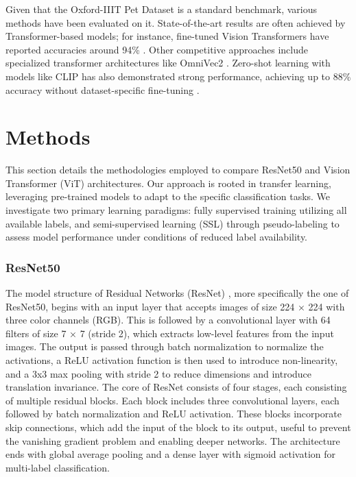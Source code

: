 \documentclass{article}
\begin{document}
Given that the Oxford-IIIT Pet Dataset is a standard benchmark, various methods have been evaluated on it. State-of-the-art results are often achieved by Transformer-based models; for instance, fine-tuned Vision Transformers have reported accuracies around 94\% \cite{HFNorburayViTPets}. Other competitive approaches include specialized transformer architectures like OmniVec2 \cite{Srivastava2024OmniVec2}. Zero-shot learning with models like CLIP has also demonstrated strong performance, achieving up to 88\% accuracy without dataset-specific fine-tuning \cite{HFMuellje3ViTPets}.



\section{Methods}
This section details the methodologies employed to compare ResNet50 and Vision Transformer (ViT) architectures. Our approach is rooted in transfer learning, leveraging pre-trained models to adapt to the specific classification tasks. We investigate two primary learning paradigms: fully supervised training utilizing all available labels, and semi-supervised learning (SSL) through pseudo-labeling to assess model performance under conditions of reduced label availability. 


\subsubsection{ResNet50}
The model structure of Residual Networks (ResNet) \cite{resnet}, more specifically the one of ResNet50, begins with an input layer that accepts images of size 224 × 224 with three color channels (RGB). This is followed by a convolutional layer with 64 filters of size 7 × 7 (stride 2),  which extracts low-level features from the input images. The output is passed through batch normalization to normalize the activations, a ReLU activation function is then used to introduce non-linearity, and a 3x3 max pooling with stride 2 to reduce dimensions and introduce translation invariance. The core of ResNet consists of four stages, each consisting of multiple residual blocks. Each block includes three convolutional layers, each followed by batch normalization and ReLU activation. These blocks incorporate skip connections, which add the input of the block to its output, useful to prevent the vanishing gradient problem and enabling deeper networks. The architecture ends with global average pooling and a dense layer with sigmoid activation for multi-label classification.
\end{document}
